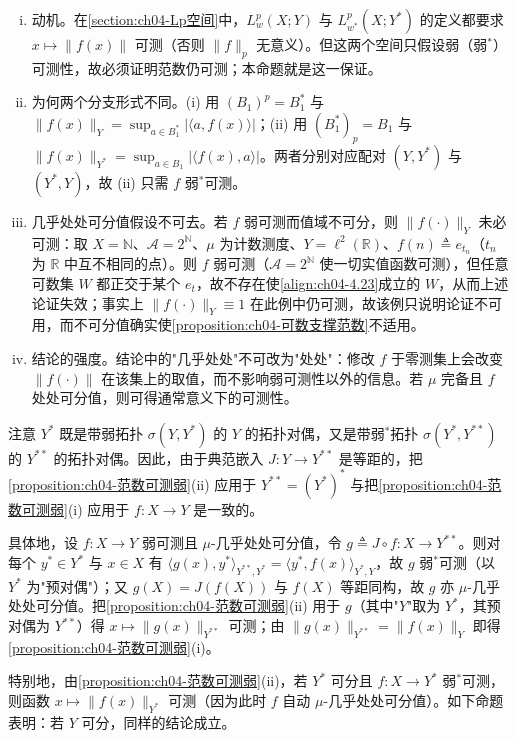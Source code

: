 \documentclass[../../main.tex]{subfiles}%
\begin{document}
\begin{remark}\label{remark:ch04-范数可测弱动机}
\begin{enumerate}[(i)]
\item 动机。在\cref{section:ch04-Lp空间}中，$L^p_w(X;Y)$ 与 $L^p_{w^*}(X;Y^*)$ 的定义都要求 $x\mapsto\|f(x)\|$ 可测（否则 $\|f\|_p$ 无意义）。但这两个空间只假设弱（弱$^*$）可测性，故必须证明范数仍可测；本命题就是这一保证。
\item 为何两个分支形式不同。(i) 用 $(B_1)^p=B_1^*$ 与 $\|f(x)\|_Y=\sup_{a\in B_1^*}|\langle a,f(x)\rangle|$；(ii) 用 $(B_1^*)_p=B_1$ 与 $\|f(x)\|_{Y^*}=\sup_{a\in B_1}|\langle f(x),a\rangle|$。两者分别对应配对 $(Y,Y^*)$ 与 $(Y^*,Y)$，故 (ii) 只需 $f$ 弱$^*$可测。
\item 几乎处处可分值假设不可去。若 $f$ 弱可测而值域不可分，则 $\|f(\cdot)\|_Y$ 未必可测：取 $X=\mathbb{N}$、$\mathcal{A}=2^{\mathbb{N}}$、$\mu$ 为计数测度、$Y=\ell^2(\mathbb{R})$、$f(n)\triangleq e_{t_n}$（$t_n$ 为 $\mathbb{R}$ 中互不相同的点）。则 $f$ 弱可测（$\mathcal{A}=2^{\mathbb{N}}$ 使一切实值函数可测），但任意可数集 $W$ 都正交于某个 $e_t$，故不存在使\eqref{align:ch04-4.23}成立的 $W$，从而上述论证失效；事实上 $\|f(\cdot)\|_Y\equiv1$ 在此例中仍可测，故该例只说明论证不可用，而不可分值确实使\cref{proposition:ch04-可数支撑范数}不适用。
\item 结论的强度。结论中的"几乎处处"不可改为"处处"：修改 $f$ 于零测集上会改变 $\|f(\cdot)\|$ 在该集上的取值，而不影响弱可测性以外的信息。若 $\mu$ 完备且 $f$ 处处可分值，则可得通常意义下的可测性。
\end{enumerate}
\end{remark}

\begin{remark}\label{remark:ch04-对偶注}
注意 $Y^*$ 既是带弱拓扑 $\sigma(Y,Y^*)$ 的 $Y$ 的拓扑对偶，又是带弱$^*$拓扑 $\sigma(Y^*,Y^{**})$ 的 $Y^{**}$ 的拓扑对偶。因此，由于典范嵌入 $J:Y\to Y^{**}$ 是等距的，把\cref{proposition:ch04-范数可测弱}(ii) 应用于 $Y^{**}=(Y^*)^*$ 与把\cref{proposition:ch04-范数可测弱}(i) 应用于 $f:X\to Y$ 是一致的。

具体地，设 $f:X\to Y$ 弱可测且 $\mu$-几乎处处可分值，令 $g\triangleq J\circ f:X\to Y^{**}$。则对每个 $y^*\in Y^*$ 与 $x\in X$ 有 $\langle g(x),y^*\rangle_{Y^{**},Y^*}=\langle y^*,f(x)\rangle_{Y^*,Y}$，故 $g$ 弱$^*$可测（以 $Y^*$ 为"预对偶"）；又 $g(X)=J(f(X))$ 与 $f(X)$ 等距同构，故 $g$ 亦 $\mu$-几乎处处可分值。把\cref{proposition:ch04-范数可测弱}(ii) 用于 $g$（其中"$Y$"取为 $Y^*$，其预对偶为 $Y^{**}$）得 $x\mapsto\|g(x)\|_{Y^{**}}$ 可测；由 $\|g(x)\|_{Y^{**}}=\|f(x)\|_Y$ 即得\cref{proposition:ch04-范数可测弱}(i)。

特别地，由\cref{proposition:ch04-范数可测弱}(ii)，若 $Y^*$ 可分且 $f:X\to Y^*$ 弱$^*$可测，则函数 $x\mapsto\|f(x)\|_{Y^*}$ 可测（因为此时 $f$ 自动 $\mu$-几乎处处可分值）。如下命题表明：若 $Y$ 可分，同样的结论成立。
\end{remark}
\end{document}
